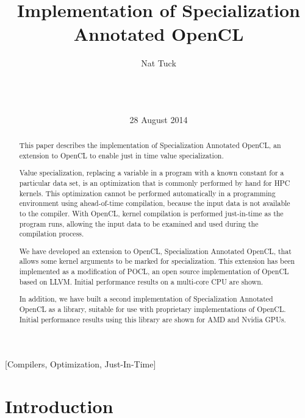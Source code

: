 \documentclass{acm_proc_article-sp}
\begin{document}
\title{Implementation of Specialization Annotated OpenCL}

\author{
\alignauthor
Nat Tuck\\
       \\
       \\
       \\
}

\date{28 August 2014}

\maketitle

\begin{abstract}
This paper describes the implementation of Specialization Annotated OpenCL, an
extension to OpenCL to enable just in time value specialization. 

Value specialization, replacing a variable in a program with a known constant
for a particular data set, is an optimization that is commonly performed by
hand for HPC kernels. This optimization cannot be performed automatically in a
programming environment using ahead-of-time compilation, because the input data
is not available to the compiler. With OpenCL, kernel compilation is performed
just-in-time as the program runs, allowing the input data to be examined and
used during the compilation process.

We have developed an extension to OpenCL, Specialization Annotated OpenCL, that
allows some kernel arguments to be marked for specialization. This extension
has been implemented as a modification of POCL, an open source implementation
of OpenCL based on LLVM. Initial performance results on a multi-core CPU are
shown.

In addition, we have built a second implementation of Specialization Annotated
OpenCL as a library, suitable for use with proprietary implementations of OpenCL.
Initial performance results using this library are shown for AMD and Nvidia GPUs.
\end{abstract}

[Compilers, Optimization,
Just-In-Time]


\section{Introduction}
\end{document}
